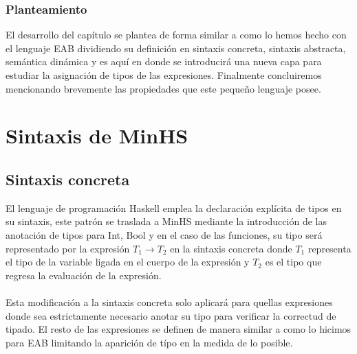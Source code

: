 \subsubsection{Planteamiento}
El desarrollo del capítulo se plantea de forma similar a como lo hemos hecho con el lenguaje \textsf{EAB} dividiendo su definición en sintaxis concreta, sintaxis abstracta, semántica dinámica y es aquí en donde se introducirá una nueva capa para estudiar la asignación de tipos de las expresiones. Finalmente concluiremos mencionando brevemente las propiedades que este pequeño lenguaje posee. \\

\section{Sintaxis de \textsf{MinHS}}

\subsection{Sintaxis concreta}
    El lenguaje de programación \textsf{Haskell} emplea la declaración explícita de tipos en su sintaxis, este patrón se traslada a \textsf{MinHS} mediante la introducción de las anotación de tipos para \textsf{Int}, \textsf{Bool} y en el caso de las funciones, su tipo será representado por la expresión $T_1 \rightarrow T_2$ en la sintaxis concreta donde $T_1$ representa el tipo de la variable ligada en el cuerpo de la expresión  y $T_2$ es el tipo que regresa la evaluación de la expresión.\\\\
Esta modificación a la sintaxis concreta solo aplicará para quellas expresiones donde sea estrictamente necesario anotar su tipo para verificar la correctud de tipado. El resto de las expresiones se definen de manera similar a como lo hicimos para \textsf{EAB} limitando la aparición de típo en la medida de lo posible.

